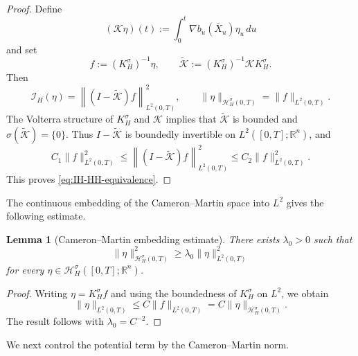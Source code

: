 \documentclass[preprint,12pt]{elsarticle}
\newtheorem{lemma}[theorem]{Lemma}
\theoremstyle{definition}
\theoremstyle{plain}
\begin{document}
\begin{proof}
Define
\begin{equation*}
    (\mathcal K\eta)(t)
    :=
    \int_0^t
    \nabla b_u(\bar X_u)\eta_u\,du
\end{equation*}
and set
\begin{equation*}
    f:=(K_H^\sigma)^{-1}\eta,
    \qquad
    \widetilde{\mathcal K}
    :=
    (K_H^\sigma)^{-1}\mathcal K K_H^\sigma.
\end{equation*}
Then
\begin{equation*}
    \mathcal I_H(\eta)
    =
    \left\|
        (I-\widetilde{\mathcal K})f
    \right\|_{L^2(0,T)}^2,
    \qquad
    \|\eta\|_{\mathcal H_H^\sigma(0,T)}
    =
    \|f\|_{L^2(0,T)}.
\end{equation*}
The Volterra structure of $K_H^\sigma$ and $\mathcal K$ implies that
$\widetilde{\mathcal K}$ is bounded and
$\sigma(\widetilde{\mathcal K})=\{0\}$. Thus
$I-\widetilde{\mathcal K}$ is boundedly invertible on
$L^2([0,T];\mathbb R^n)$, and
\begin{equation*}
    C_1\|f\|_{L^2(0,T)}^2
    \leq
    \left\|
        (I-\widetilde{\mathcal K})f
    \right\|_{L^2(0,T)}^2
    \leq
    C_2\|f\|_{L^2(0,T)}^2.
\end{equation*}
This proves \eqref{eq:IH-HH-equivalence}.
\end{proof} 

The continuous embedding of the Cameron--Martin space into $L^2$
gives the following estimate.

\begin{lemma}[Cameron--Martin embedding estimate]
\label{lem:HH-poincare}
There exists $\lambda_0>0$ such that
\begin{equation}
\label{eq:HH-poincare}
    \|\eta\|_{\mathcal H_H^\sigma(0,T)}^2
    \geq
    \lambda_0\|\eta\|_{L^2(0,T)}^2
\end{equation}
for every
$\eta\in\mathcal H_H^\sigma([0,T];\mathbb R^n)$.
\end{lemma}

\begin{proof}
Writing $\eta=K_H^\sigma f$ and using the boundedness of
$K_H^\sigma$ on $L^2$, we obtain
\begin{equation*}
    \|\eta\|_{L^2(0,T)}
    \leq
    C\|f\|_{L^2(0,T)}
    =
    C\|\eta\|_{\mathcal H_H^\sigma(0,T)}.
\end{equation*}
The result follows with $\lambda_0=C^{-2}$.
\end{proof}

We next control the potential term by the Cameron--Martin norm.
\end{document}
